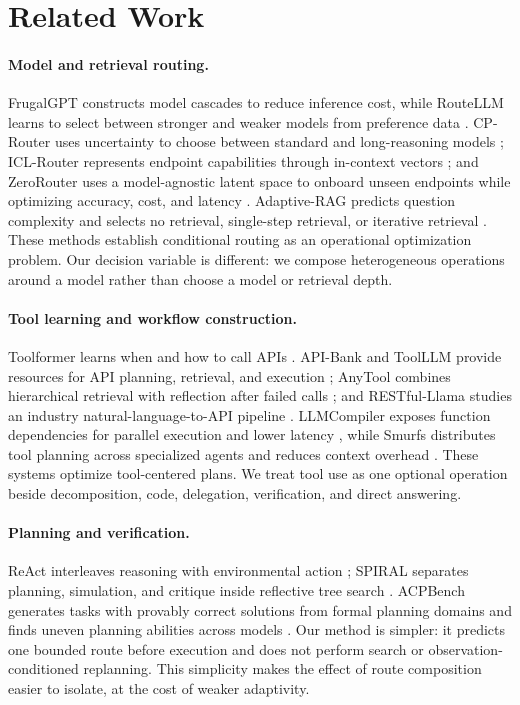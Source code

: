 \documentclass[letterpaper]{article} %
\begin{document}
\section{Related Work}

\paragraph{Model and retrieval routing.}
FrugalGPT constructs model cascades to reduce inference cost, while RouteLLM learns to select between stronger and weaker models from preference data \citep{chen2024frugalgpt,ong2025routellm}. CP-Router uses uncertainty to choose between standard and long-reasoning models \citep{su2026cprouter}; ICL-Router represents endpoint capabilities through in-context vectors \citep{wang2026iclrouter}; and ZeroRouter uses a model-agnostic latent space to onboard unseen endpoints while optimizing accuracy, cost, and latency \citep{yan2026zerorouter}. Adaptive-RAG predicts question complexity and selects no retrieval, single-step retrieval, or iterative retrieval \citep{jeong2024adaptiverag}. These methods establish conditional routing as an operational optimization problem. Our decision variable is different: we compose heterogeneous operations around a model rather than choose a model or retrieval depth.

\paragraph{Tool learning and workflow construction.}
Toolformer learns when and how to call APIs \citep{schick2023toolformer}. API-Bank and ToolLLM provide resources for API planning, retrieval, and execution \citep{li2023apibank,qin2024toolllm}; AnyTool combines hierarchical retrieval with reflection after failed calls \citep{du2024anytool}; and RESTful-Llama studies an industry natural-language-to-API pipeline \citep{xu2024restful}. LLMCompiler exposes function dependencies for parallel execution and lower latency \citep{kim2024llmcompiler}, while Smurfs distributes tool planning across specialized agents and reduces context overhead \citep{chen2025smurfs}. These systems optimize tool-centered plans. We treat tool use as one optional operation beside decomposition, code, delegation, verification, and direct answering.

\paragraph{Planning and verification.}
ReAct interleaves reasoning with environmental action \citep{yao2023react}; SPIRAL separates planning, simulation, and critique inside reflective tree search \citep{zhang2026spiral}. ACPBench generates tasks with provably correct solutions from formal planning domains and finds uneven planning abilities across models \citep{kokel2025acpbench}. Our method is simpler: it predicts one bounded route before execution and does not perform search or observation-conditioned replanning. This simplicity makes the effect of route composition easier to isolate, at the cost of weaker adaptivity.
\end{document}
